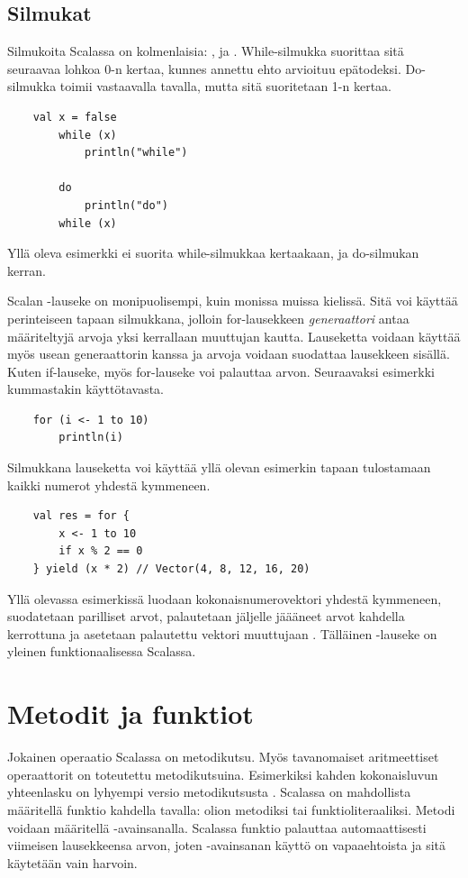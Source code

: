 \subsection{Silmukat}
Silmukoita Scalassa on kolmenlaisia: ,  ja . While-silmukka suorittaa sitä seuraavaa lohkoa 0-n kertaa, kunnes annettu ehto arvioituu epätodeksi. Do-silmukka toimii vastaavalla tavalla, mutta sitä suoritetaan 1-n kertaa.
\begin{lstlisting}
    val x = false
		while (x)
			println("while")
		
		do
			println("do")
        while (x)
\end{lstlisting}
Yllä oleva esimerkki ei suorita while-silmukkaa kertaakaan, ja do-silmukan kerran.
\cite[Luku 2.5]{scalaForTheImpatient}

Scalan -lauseke on monipuolisempi, kuin monissa muissa kielissä. Sitä voi käyttää perinteiseen tapaan silmukkana, jolloin for-lausekkeen \textit{generaattori} antaa määriteltyjä arvoja yksi kerrallaan muuttujan  kautta. Lauseketta voidaan käyttää myös usean generaattorin kanssa ja arvoja voidaan suodattaa lausekkeen sisällä. Kuten if-lauseke, myös for-lauseke voi palauttaa arvon. Seuraavaksi esimerkki kummastakin käyttötavasta.
\begin{lstlisting}
    for (i <- 1 to 10)
        println(i)
\end{lstlisting}
Silmukkana lauseketta voi käyttää yllä olevan esimerkin tapaan tulostamaan kaikki numerot yhdestä kymmeneen.
\begin{lstlisting}
    val res = for {
        x <- 1 to 10
        if x % 2 == 0
    } yield (x * 2) // Vector(4, 8, 12, 16, 20)
\end{lstlisting}
Yllä olevassa esimerkissä luodaan kokonaisnumerovektori yhdestä kymmeneen, suodatetaan parilliset arvot, palautetaan jäljelle jäääneet arvot kahdella kerrottuna ja asetetaan palautettu vektori muuttujaan . Tälläinen -lauseke on yleinen funktionaalisessa Scalassa.
\cite[Luku 2.6]{scalaForTheImpatient}


\section{Metodit ja funktiot} \label{MetoditJaFunktiot}
Jokainen operaatio Scalassa on metodikutsu. Myös tavanomaiset aritmeettiset operaattorit on toteutettu metodikutsuina. Esimerkiksi kahden kokonaisluvun yhteenlasku  on lyhyempi versio metodikutsusta . Scalassa on mahdollista määritellä funktio kahdella tavalla: olion metodiksi tai funktioliteraaliksi. Metodi voidaan määritellä -avainsanalla.
Scalassa funktio palauttaa automaattisesti viimeisen lausekkeensa arvon, joten -avainsanan käyttö on vapaaehtoista ja sitä käytetään vain harvoin.
\cite[Luku 1.4]{scalaForTheImpatient}
\cite[Basics]{tourOfScala}

